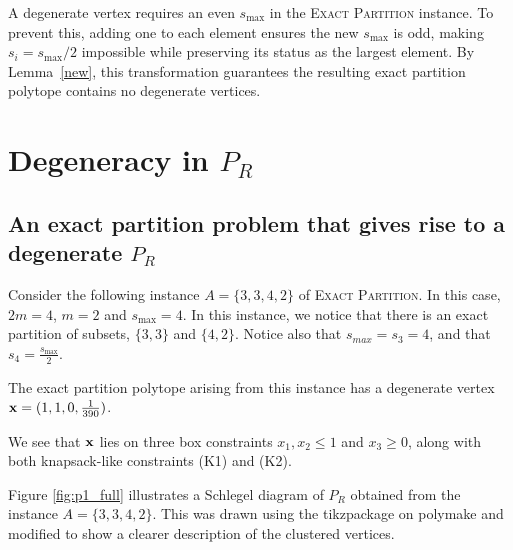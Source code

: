 \documentclass[3p, twocolumn]{elsarticle}
\def\ve#1{\mathchoice{\mbox{\boldmath$\displaystyle\bf#1$}}
{\mbox{\boldmath$\textstyle\bf#1$}}
{\mbox{\boldmath$\scriptstyle\bf#1$}}
{\mbox{\boldmath$\scriptscriptstyle\bf#1$}}}
\begin{document}
A degenerate vertex requires an even $s_{\max}$ in the \textsc{Exact Partition} instance. To prevent this, adding one to each element ensures the new $s_{\max}$ is odd, making $s_i = s_{\max}/2$ impossible while preserving its status as the largest element. By Lemma~\ref{new}, this transformation guarantees the resulting exact partition polytope contains no degenerate vertices.


\section{Degeneracy in $P_R$} \label{se:degen_example}

\subsection{An exact partition problem that gives rise to a degenerate $P_R$}\label{counter}
Consider the following instance $A = \{3,3,4,2\}$ of \textsc{Exact Partition}. In this case, $2m = 4$, $m=2$ and $s_{\max}=4$. In this instance, we notice that there is an exact partition of subsets, $\{3,3\}$ and $\{4,2\}$. Notice also that $s_{max}=s_3=4$, and that $s_4=\frac{s_{\max}}{2}$. 

The exact partition polytope arising from this instance has a degenerate vertex $\ve{x}=(1, 1, 0, \frac{1}{390})$.

We see that $\ve{x}$ lies on three box constraints $x_1,x_2\leq 1$ and $x_3\geq0$, along with both knapsack-like constraints (K1) and (K2).

Figure \ref{fig:p1_full} illustrates a Schlegel diagram of $P_R$ obtained from the instance $A = \{3,3,4,2\}$.  This was drawn using the tikzpackage on polymake \cite{polymake} and modified to show a clearer description of the clustered vertices. 
\end{document}
